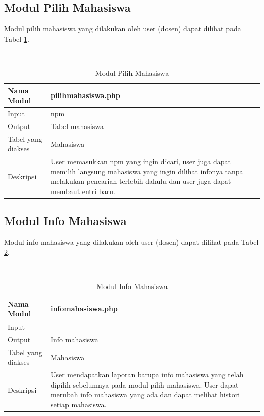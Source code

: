 \subsection{Modul Pilih Mahasiswa}
Modul pilih mahasiswa yang dilakukan oleh user (dosen) dapat dilihat pada Tabel \ref{tab:modulpilihmahasiswa}.

\begin{center}
\begin{table}
\caption[Tabel 4-2 Modul Pilih Mahasiswa]{Modul Pilih Mahasiswa}\\
\label{tab:modulpilihmahasiswa}
\begin{center}
\begin{tabular}{ l p{10cm} }
\hline
Nama Modul & pilihmahasiswa.php\\
\hline
Input & npm\\
\hline
Output & Tabel mahasiswa\\
\hline
Tabel yang diakses & Mahasiswa\\
\hline
Deskripsi & User memasukkan npm yang ingin dicari, user juga dapat memilih langsung mahasiswa yang ingin dilihat infonya tanpa melakukan pencarian terlebih dahulu dan user juga dapat membaut entri baru.\\
\hline
\end{tabular}
\end{center}
\end{table}
\end{center}

\subsection{Modul Info Mahasiswa}
Modul info mahasiswa yang dilakukan oleh user (dosen) dapat dilihat pada Tabel \ref{tab:modulinfomahasiswa}.

\begin{center}
\begin{table}
\caption[Tabel 4-3 Modul Info Mahasiswa]{Modul Info Mahasiswa}\\
\label{tab:modulinfomahasiswa}
\begin{center}
\begin{tabular}{ l p{10cm} }
\hline
Nama Modul & infomahasiswa.php\\
\hline
Input & -\\
\hline
Output & Info mahasiswa\\
\hline
Tabel yang diakses & Mahasiswa\\
\hline
Deskripsi & User mendapatkan laporan barupa info mahasiswa yang telah dipilih sebelumnya pada modul pilih mahasiswa. User dapat merubah info mahasiswa yang ada dan dapat melihat histori setiap mahasiswa.\\
\hline
\end{tabular}
\end{center}
\end{table}
\end{center}

